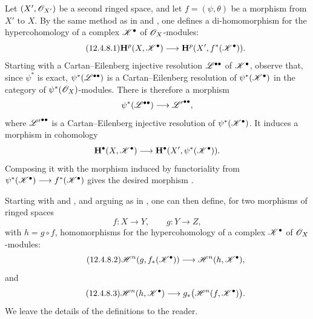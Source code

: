 \begin{env}[12.4.8]
\label{0.12.4.8}
Let $(X',\mathscr{O}_{X'})$ be a second ringed space, and let
$f=(\psi,\theta)$ be a morphism from $X'$ to $X$.
By the same method as in  and , one
defines a di-homomorphism for the hypercohomology of a complex
$\mathscr{K}^\bullet$ of $\mathscr{O}_X$-modules:
\begin{equation}
\label{0.12.4.8.1}
\tag{12.4.8.1}
  \mathbf{H}^p(X,\mathscr{K}^\bullet)
  \longrightarrow
  \mathbf{H}^p(X',f^*(\mathscr{K}^\bullet)).
\end{equation}
Starting with a Cartan--Eilenberg injective resolution
$\mathscr{L}^{\bullet\bullet}$ of $\mathscr{K}^\bullet$, observe that, since
$\psi^*$ is exact, $\psi^*(\mathscr{L}^{\bullet\bullet})$ is a
Cartan--Eilenberg resolution of $\psi^*(\mathscr{K}^\bullet)$ in the
category of $\psi^*(\mathscr{O}_X)$-modules.
There is therefore a morphism
\[
  \psi^*(\mathscr{L}^{\bullet\bullet})
  \longrightarrow
  {\mathscr{L}'}^{\bullet\bullet},
\]
where ${\mathscr{L}'}^{\bullet\bullet}$ is a Cartan--Eilenberg injective
resolution of $\psi^*(\mathscr{K}^\bullet)$.
It induces a morphism in cohomology
\[
  \mathbf{H}^\bullet(X,\mathscr{K}^\bullet)
  \longrightarrow
  \mathbf{H}^\bullet
  (X',\psi^*(\mathscr{K}^\bullet)).
\]
Composing it with the morphism induced by functoriality from
$\psi^*(\mathscr{K}^\bullet)\longrightarrow f^*(\mathscr{K}^\bullet)$ gives
the desired morphism .

Starting with  and , and arguing as
in , one can then define, for two morphisms of ringed
spaces
\[
  f:X\longrightarrow Y,
  \qquad
  g:Y\longrightarrow Z,
\]
with $h=g\circ f$, homomorphisms for the hypercohomology of a complex
$\mathscr{K}^\bullet$ of $\mathscr{O}_X$-modules:
\begin{equation}
\label{0.12.4.8.2}
\tag{12.4.8.2}
  \mathscr{H}^n(g,f_*(\mathscr{K}^\bullet))
  \longrightarrow
  \mathscr{H}^n(h,\mathscr{K}^\bullet),
\end{equation}
and
\begin{equation}
\label{0.12.4.8.3}
\tag{12.4.8.3}
  \mathscr{H}^n(h,\mathscr{K}^\bullet)
  \longrightarrow
  g_*\bigl(\mathscr{H}^n(f,\mathscr{K}^\bullet)\bigr).
\end{equation}
We leave the details of the definitions to the reader.
\end{env}
